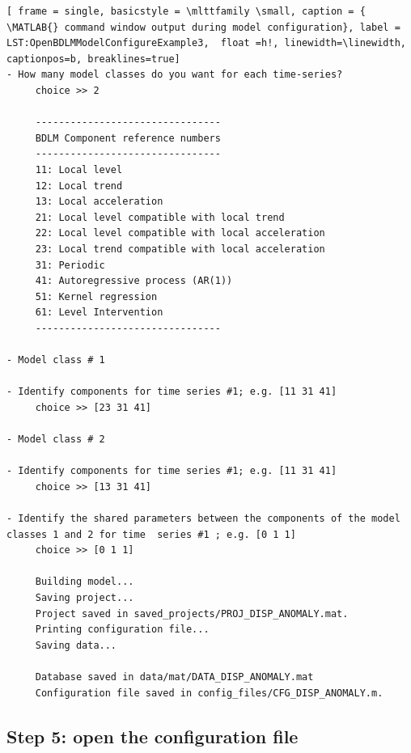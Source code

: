  \begin{lstlisting}[ frame = single, basicstyle = \mlttfamily \small, caption = { \MATLAB{} command window output during model configuration}, label = LST:OpenBDLMModelConfigureExample3,  float =h!, linewidth=\linewidth, captionpos=b, breaklines=true]
- How many model classes do you want for each time-series? 
     choice >> 2
     
     --------------------------------
     BDLM Component reference numbers
     --------------------------------
     11: Local level 
     12: Local trend 
     13: Local acceleration 
     21: Local level compatible with local trend 
     22: Local level compatible with local acceleration 
     23: Local trend compatible with local acceleration 
     31: Periodic 
     41: Autoregressive process (AR(1)) 
     51: Kernel regression 
     61: Level Intervention 
     --------------------------------

- Model class # 1 

- Identify components for time series #1; e.g. [11 31 41]
     choice >> [23 31 41]

- Model class # 2 

- Identify components for time series #1; e.g. [11 31 41]
     choice >> [13 31 41]

- Identify the shared parameters between the components of the model classes 1 and 2 for time  series #1 ; e.g. [0 1 1]
     choice >> [0 1 1]

     Building model...
     Saving project...
     Project saved in saved_projects/PROJ_DISP_ANOMALY.mat. 
     Printing configuration file...
     Saving data...

     Database saved in data/mat/DATA_DISP_ANOMALY.mat 
     Configuration file saved in config_files/CFG_DISP_ANOMALY.m. 
\end{lstlisting}



\subsection{Step 5: open the configuration file}

